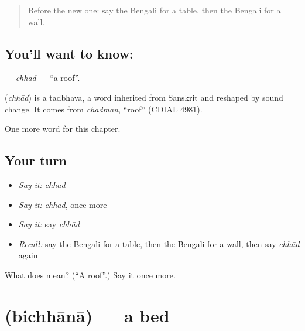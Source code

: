 \label{lesson:BN-C60-chhad}



\begin{quote}
Before the new one: say the Bengali for a table, then the Bengali for a wall.
\end{quote}

\subsection*{You'll want to know: }
\textbf{} — \emph{chhād} — \textquotedblleft{}a roof\textquotedblright{}.

\begin{cousinweb}
\textbf{} (\emph{chhād}) is a tadbhava, a word inherited from Sanskrit and reshaped by sound change. It comes from \emph{chadman}, \textquotedblleft{}roof\textquotedblright{} (CDIAL 4981).
\end{cousinweb}

\begin{grammarlens}[title={What you've built}]
One more word for this chapter.
\end{grammarlens}

\subsection*{Your turn}
\begin{itemize}
\raggedright
  \item \emph{Say it:} \emph{chhād}
  \item \emph{Say it:} \emph{chhād}, once more
  \item \emph{Say it:} say \emph{chhād}
  \item \emph{Recall:} say the Bengali for a table, then the Bengali for a wall, then say \emph{chhād} again
\end{itemize}

\begin{tcolorbox}[breakable,colback=teal!4,colframe=teal!35!black,title={Before you move on}]
What does  mean? (\textquotedblleft{}A roof\textquotedblright{}.) Say it once more.
\end{tcolorbox}
\section[\texorpdfstring{\bn{বিছানা} (bichhānā)}{বিছানা (bichhānā)}]{ (bichhānā) — a bed}

\label{lesson:BN-C60-bichhana}



